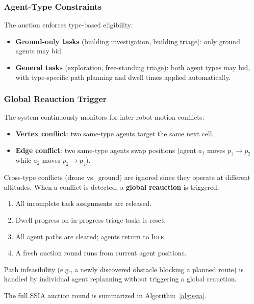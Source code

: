 \documentclass[conference]{IEEEtran}
\begin{document}
\subsubsection{Agent-Type Constraints}
The auction enforces type-based eligibility:
\begin{itemize}
    \item \textbf{Ground-only tasks} (building investigation, building triage): only ground agents may bid.
    \item \textbf{General tasks} (exploration, free-standing triage): both agent types may bid, with type-specific path planning and dwell times applied automatically.
\end{itemize}

\subsubsection{Global Reauction Trigger}
The system continuously monitors for inter-robot motion conflicts:
\begin{itemize}
    \item \textbf{Vertex conflict}: two same-type agents target the same next cell.
    \item \textbf{Edge conflict}: two same-type agents swap positions (agent $a_1$ moves $p_1 \to p_2$ while $a_2$ moves $p_2 \to p_1$).
\end{itemize}
Cross-type conflicts (drone vs.\ ground) are ignored since they operate at different altitudes. When a conflict is detected, a \textbf{global reauction} is triggered:
\begin{enumerate}
    \item All incomplete task assignments are released.
    \item Dwell progress on in-progress triage tasks is reset.
    \item All agent paths are cleared; agents return to \textsc{Idle}.
    \item A fresh auction round runs from current agent positions.
\end{enumerate}
Path infeasibility (e.g., a newly discovered obstacle blocking a planned route) is handled by individual agent replanning without triggering a global reauction.

The full SSIA auction round is summarized in Algorithm~\ref{alg:ssia}.
\end{document}

